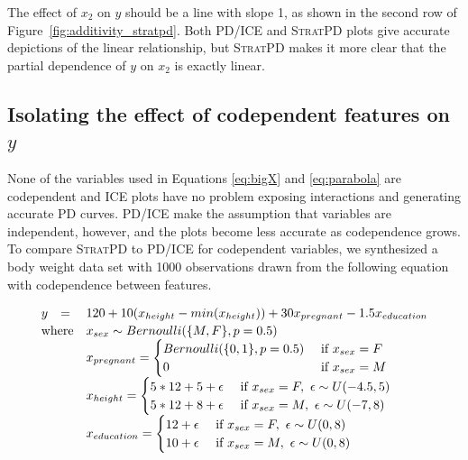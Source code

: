 \documentclass[12pt]{article}
\newcommand{\figref}[1]{Figure~\ref{#1}}
\newcommand{\spd}{\fontfamily{cmr}\textsc{\small StratPD}}
\begin{document}
The effect of $x_2$ on $y$ should be a line with slope 1, as shown in the second row of \figref{fig:additivity_stratpd}. Both PD/ICE and \spd{} plots give accurate depictions of the linear relationship, but \spd{} makes it more clear that the partial dependence of $y$ on $x_2$ is exactly linear.

\subsection{Isolating the effect of codependent features on $y$}\label{sec:codep}

None of the variables used in Equations \eqref{eq:bigX} and \eqref{eq:parabola} are codependent and ICE plots have no problem exposing interactions and generating accurate PD curves.  PD/ICE make the assumption that variables are independent, however, and the plots become less accurate as codependence grows.  To compare \spd{} to PD/ICE for codependent variables, we synthesized a body weight data set with 1000 observations drawn from the following equation with codependence between features.

\begin{equation}\label{eq:weight}
\begin{array}{rll}
y & = &120 + 10(x_{height} - min(x_{height})) + 30x_{pregnant} - 1.5x_{education}\\
\vspace{-10pt}\\
\multicolumn{2}{r}{\text{where}} & x_{sex} \sim Bernoulli(\{M,F\}, p=0.5)\\
                    & & x_{pregnant} = \begin{cases}
                                               Bernoulli(\{0,1\},p=0.5) & \text{ if } x_{sex} = F\\
                                               0 & \text{ if } x_{sex}=M\\
                                               \end{cases}\\
                    & & x_{height} = \begin{cases}
                                               5*12+5+ \epsilon & \text{ if } x_{sex}=F,~ \epsilon \sim U(-4.5,5)\\	
                                               5*12+8 + \epsilon & \text{ if } x_{sex}=M,~ \epsilon \sim U(-7,8)\\
                                               \end{cases}\\
                    & & x_{education} = \begin{cases}
                                               12 + \epsilon & \text{ if } x_{sex}=F,~ \epsilon \sim U(0,8)\\	
                                               10 + \epsilon & \text{ if } x_{sex}=M,~ \epsilon \sim U(0,8)\\
                                               \end{cases}
\end{array}
\end{equation}
\end{document}
